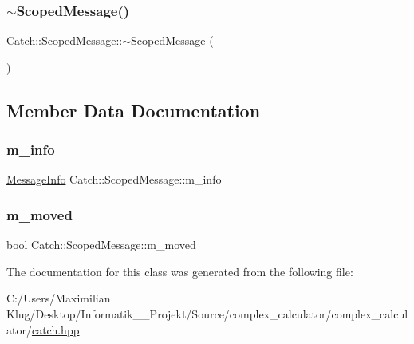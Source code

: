 \mbox{\label{class_catch_1_1_scoped_message_a43190843f9eeb84a0b42b0bc95fdf93a}} 
\subsubsection{\texorpdfstring{$\sim$\+Scoped\+Message()}{~ScopedMessage()}}
{\footnotesize\ttfamily Catch\+::\+Scoped\+Message\+::$\sim$\+Scoped\+Message (\begin{DoxyParamCaption}{ }\end{DoxyParamCaption})}



\subsection{Member Data Documentation}
\mbox{\label{class_catch_1_1_scoped_message_ae6e1476f389cc6e1586f033b3747b27b}} 
\subsubsection{\texorpdfstring{m\+\_\+info}{m\_info}}
{\footnotesize\ttfamily \mbox{\hyperlink{struct_catch_1_1_message_info}{Message\+Info}} Catch\+::\+Scoped\+Message\+::m\+\_\+info}

\mbox{\label{class_catch_1_1_scoped_message_a4fe5607c1f7407240a0da8405b1c12e7}} 
\subsubsection{\texorpdfstring{m\+\_\+moved}{m\_moved}}
{\footnotesize\ttfamily bool Catch\+::\+Scoped\+Message\+::m\+\_\+moved}



The documentation for this class was generated from the following file\+:\begin{DoxyCompactItemize}
\item 
C\+:/\+Users/\+Maximilian Klug/\+Desktop/\+Informatik\+\_\+\_\+\+Projekt/\+Source/complex\+\_\+calculator/complex\+\_\+calculator/\mbox{\hyperlink{catch_8hpp}{catch.\+hpp}}\end{DoxyCompactItemize}
